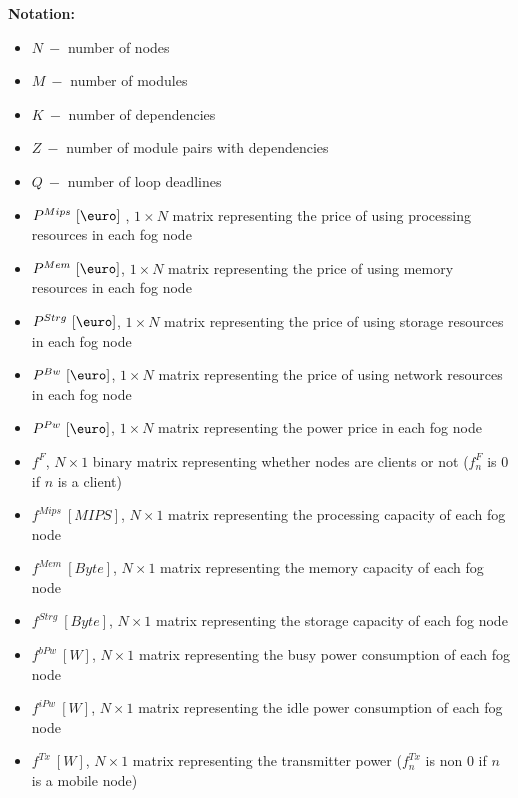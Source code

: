 \documentclass{article}
\begin{document}
\newcommand{\SubItem}[1]{
    {\setlength\itemindent{15pt} \item[-] #1}
}

\noindent\textbf{Notation:}
\begin{itemize}
	\item $N~-$ number of nodes
	\item $M~-$ number of modules
	\item $K~-$ number of dependencies
	\item $Z~-$ number of module pairs with dependencies
	\item $Q~-$ number of loop deadlines\\
	
	\item $P^{Mips}~[\mbox{\euro}]~$, $1\times N$ matrix representing the price of using processing resources in each fog node
	\item $P^{Mem}~[\mbox{\euro}]$, $1\times N$ matrix representing the price of using memory resources in each fog node
	\item $P^{Strg}~[\mbox{\euro}]$, $1\times N$ matrix representing the price of using storage resources in each fog node
	\item $P^{Bw}~[\mbox{\euro}]$, $1\times N$ matrix representing the price of using network resources in each fog node
	\item $P^{Pw}~[\mbox{\euro}]$, $1\times N$ matrix representing the power price in each fog node\\
	
	\item $f^{F}$, $N\times 1$ binary matrix representing whether nodes are clients or not ($f^{F}_n$ is 0 if $n$ is a client)
	\item $f^{Mips}~[MIPS]$, $N\times 1$ matrix representing the processing capacity of each fog node
	\item $f^{Mem}~[Byte]$, $N\times 1$ matrix representing the memory capacity of each fog node
	\item $f^{Strg}~[Byte]$, $N\times 1$ matrix representing the storage capacity of each fog node
	\item $f^{bPw}~[W]$, $N\times 1$ matrix representing the busy power consumption of each fog node
	\item $f^{iPw}~[W]$, $N\times 1$ matrix representing the idle power consumption of each fog node
	\item $f^{Tx}~[W]$, $N\times 1$ matrix representing the transmitter power ($f^{Tx}_n$ is non 0 if $n$ is a mobile node)\\
	

\end{itemize}
\end{document}

